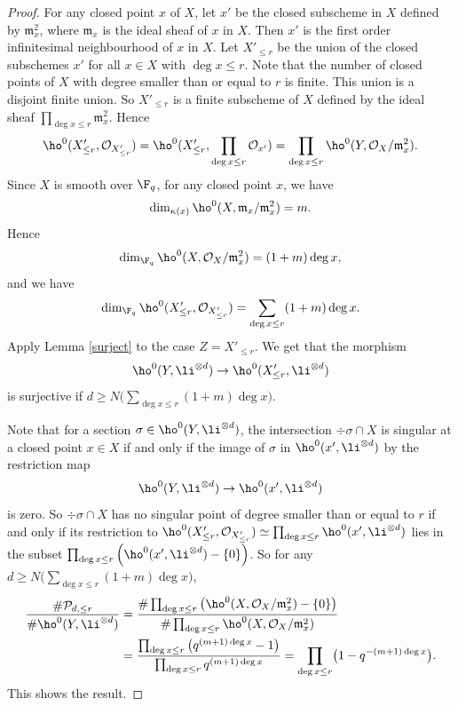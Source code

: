 \begin{proof}
For any closed point $x$ of $X$, let $x'$ be the closed subscheme in $X$ defined by $\mathfrak{m}_x^2$, where $\mathfrak{m}_x$ is the ideal sheaf of $x$ in $X$. Then $x'$ is the first order infinitesimal neighbourhood of $x$ in $X$. Let $X'_{\leq r}$ be the union of the closed subschemes $x'$ for all $x\in X$ with $\deg x\leq r$. Note that the number of closed points of $X$ with degree smaller than or equal to $r$ is finite. This union is a disjoint finite union. So $X'_{\leq r}$ is a finite subscheme of $X$ defined by the ideal sheaf $\prod_{\deg x\leq r}\mathfrak{m}_x^2$. Hence
\[
\ho^0(X'_{\leq r},\mathcal{O}_{X'_{\leq r}})=\ho^0(X'_{\leq r}, \prod_{\deg x\leq r } \mathcal{O}_{x'})=\prod_{\deg x\leq r }\ho^0(Y, \mathcal{O}_X/\mathfrak{m}_x^2).
\]
Since $X$ is smooth over $\F_q$, for any closed point $x$, we have
\[
\dim_{\kappa(x)} \ho^0(X, \mathfrak{m}_x/\mathfrak{m}_x^2)=m.
\]
Hence
\[
\dim_{\F_q} \ho^0(X, \mathcal{O}_X/\mathfrak{m}_x^2)=(1+m)\deg x,
\]
and we have
\[
\dim_{\F_q}\ho^0(X'_{\leq r},\mathcal{O}_{X'_{\leq r}})=\sum_{\deg x\leq r} (1+m)\deg x .
\]
Apply Lemma \ref{surject} to the case $Z=X'_{\leq r}$. We get that the morphism
\[
\ho^0(Y, \li^{\otimes d})\to \ho^0(X'_{\leq r}, \li^{\otimes d})
\]
is surjective if $d\geq N\bigl(\sum_{\deg x\leq r}(1+m)\deg x\bigr)$.

Note that for a section $\sigma\in \ho^0(Y, \li^{\otimes d})$, the intersection $\div \sigma\cap X$ is singular at a closed point $x\in X$ if and only if the image of $\sigma$ in $\ho^0(x', \li^{\otimes d})$ by the restriction map
\[
\ho^0(Y, \li^{\otimes d})\to \ho^0(x', \li^{\otimes d})
\]
is zero. So $\div \sigma\cap X$ has no singular point of degree smaller than or equal to $r$ if and only if its restriction to $\ho^0(X'_{\leq r},\mathcal{O}_{X'_{\leq r}})\simeq\prod_{\deg x\leq r }\ho^0(x', \li^{\otimes d})$ lies in the subset $\prod_{\deg x\leq r }\left(\ho^0(x', \li^{\otimes d})-\{0\}\right)$. So for any $d\geq N\bigl(\sum_{\deg x\leq r}(1+m)\deg x\bigr)$,
\begin{align*}
\frac{\#\mathcal{P}_{d,\leq r}}{\#\ho^0(Y, \li^{\otimes d})}&=\frac{\#\prod_{\deg x\leq r }\left(\ho^0(X, \mathcal{O}_X/\mathfrak{m}_x^2)-\{0\}\right)}{\#\prod_{\deg x\leq r }\ho^0(X, \mathcal{O}_X/\mathfrak{m}_x^2)}\\
&=\frac{\prod_{\deg x\leq r }\left(q^{(m+1)\deg x}-1\right)}{\prod_{\deg x\leq r }q^{(m+1)\deg x}}=\prod_{\deg x\leq r} \bigl(1-q^{-(m+1)\deg x} \bigr).
\end{align*}
This shows the result.
\end{proof}

